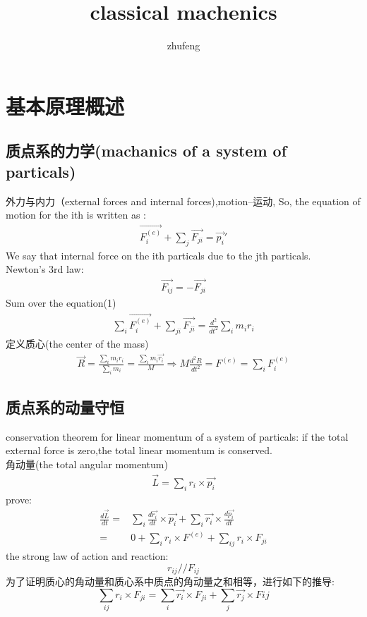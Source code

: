 \documentclass[UTF8,10pt]{article}
\begin{document}
\title{classical machenics}
\author{zhufeng}
\date{}
\maketitle
\thispagestyle{empty}%
\newpage%
\tableofcontents
\thispagestyle{empty}%
\newpage
{}%
\setcounter{page}{1}
\section{基本原理概述}
\subsection{质点系的力学(machanics of a system of particals)}
外力与内力（external forces and internal forces),motion--运动,
So, the equation of motion for the ith is written as :
\begin{align*}
    \vec{F_{i}^{(e)}}+\sum_{j}\vec{F_{ji}}=\vec{p_i}'
\end{align*}
We say that internal force on the ith particals due to the jth particals.\\
Newton's 3rd law:
\begin{align*}
    \vec{F_{ij}}=-\vec{F_{ji}}
\end{align*}
Sum over the equation(1)
\begin{align*}
    \sum_{i}\vec{F_{i}^{(e)}}+\sum_{ji}\vec{F_{ji}}=\frac{d^2}{dt^2}\sum_i m_ir_i
\end{align*}
定义质心(the center of the mass)
\begin{align*}
    \vec{R} = \frac{\sum_im_ir_i}{\sum_i m_i}=\frac{\sum_im_i\vec{r_i}}{M}
    \Rightarrow M\frac{d^2R}{dt^2} =F^{(e)} = \sum_i F_i^{(e)}
\end{align*}
\subsection{质点系的动量守恒}
conservation theorem for linear momentum of a system of particals:
if the total external force is zero,the total linear momentum is conserved.\\
角动量(the total angular momentum)
\begin{align*}
    \vec{L}=\sum_i r_i\times \vec{p_i}
\end{align*}
prove:
\begin{align*}
    \frac{d\vec{L}}{dt}= & \sum_i \frac{d\vec{r_i}}{dt}\times \vec{p_i}+
    \sum_i \vec{r_i}\times\frac{d\vec{p_i}}{dt}                                  \\
    =                    & 0+\sum_i r_i\times F^{(e)}+\sum_{ij} r_i\times F_{ji}
\end{align*}
the strong law of action and reaction:
\[r_{ij}//F_{ij}\]
\newline
为了证明质心的角动量和质心系中质点的角动量之和相等，进行如下的推导:
\[\sum_{ij} r_i\times F_{ji} = \sum_i\vec{r_i}\times F_{ji}+\sum_j\vec{r_j}\times F{ij}\]
\end{document}
